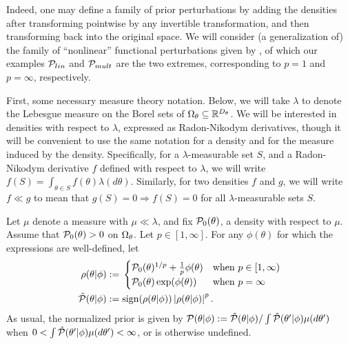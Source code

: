 Indeed, one may define a family of prior perturbations by adding the densities
after transforming pointwise by any invertible transformation, and then
transforming back into the original space.  We will consider (a generalization
of) the family of ``nonlinear'' functional perturbations given by
\citep{gustafson:1996:local}, of which our examples $\mathcal{P}_{lin}$ and $\mathcal{P}_{mult}$
are the two extremes, corresponding to $p=1$ and $p=\infty$, respectively.

First, some necessary measure theory notation. Below, we will take $\lambda$ to
denote the Lebesgue measure on the Borel sets of $\Omega_{\theta} \subseteq
\mathbb{R}^{{D_{\theta}}}$.  We will be interested in densities with respect to
$\lambda$, expressed as Radon-Nikodym derivatives, though it will be convenient
to use the same notation for a density and for the measure induced by the
density.  Specifically, for a $\lambda$-measurable set $S$, and a Radon-Nikodym
derivative $f$ defined with respect to $\lambda$, we will write $f(S) =
\int_{\theta \in S} f(\theta) \lambda(d\theta)$.  Similarly, for two densities
$f$ and $g$, we will write $f \ll g$ to mean that $g(S) = 0 \Rightarrow f(S) =
0$ for all $\lambda$-measurable sets $S$.

\begin{defn}
%
Let $\mu$ denote a measure with $\mu \ll \lambda$, and fix $\mathcal{P}_{0}(\theta)$, a
density with respect to $\mu$.  Assume that $\mathcal{P}_{0}(\theta) > 0$ on $\Omega_{\theta}$.
Let $p \in [1, \infty]$.  For any $\phi(\theta)$ for which the expressions are
well-defined, let
%
\begin{align*}
%
\rho(\theta \vert \phi) :={}& \begin{cases}
%
\pbase(\theta)^{1/p} + \frac{1}{p}\phi(\theta)
    & \textrm{when }p \in [1, \infty) \\
\pbase(\theta)\exp(\phi(\theta))
    & \textrm{when }p = \infty
%
\end{cases}\\
%
\tilde{\p}(\theta \vert \phi) :={}&
    \mathrm{sign}(\rho(\theta \vert \phi)) \abs{\rho(\theta \vert \phi)}^p.
%
\end{align*}
%
As usual, the normalized prior is given by
$\mathcal{P}(\theta \vert \phi) :=
    \tilde{\mathcal{P}}(\theta \vert \phi) /
         \int \tilde{\mathcal{P}}(\theta' \vert \phi) \mu(d\theta')$
when $0 < \int \tilde{\mathcal{P}}(\theta' \vert \phi) \mu(d\theta') < \infty$,
or is otherwise undefined.
%
\end{defn}
%

